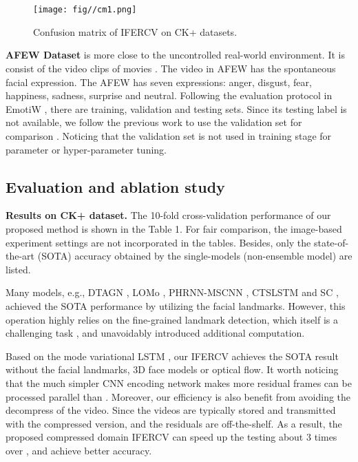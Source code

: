 \documentclass[a4paper,conference]{IEEEtran}
\begin{document}
\begin{figure}[t]
\centering
~\\~\\\texttt{[image: fig//cm1.png]}\\
\caption{Confusion matrix of IFERCV on CK+ datasets.}\label{fig:4} 
\end{figure}

\noindent\textbf{AFEW Dataset} is more close to the uncontrolled real-world environment. It is consist of the video clips of movies \cite{perveen2018spontaneous}. The video in AFEW has the spontaneous facial expression. The AFEW has seven expressions: anger, disgust, fear, happiness, sadness, surprise and neutral. Following the evaluation protocol in EmotiW \cite{dhall2017individual}, there are training, validation and testing sets. Since its testing label is not available, we follow the previous work to use the validation set for comparison \cite{baddar2019mode}. Noticing that the validation set is not used in training stage for parameter or hyper-parameter tuning. 





 


 




\subsection{Evaluation and ablation study}







\noindent\textbf{Results on CK+ dataset.} The 10-fold cross-validation performance of our proposed method is shown in the Table 1. For fair comparison, the image-based experiment settings are not incorporated in the tables. Besides, only the state-of-the-art (SOTA) accuracy obtained by the single-models (non-ensemble model) are listed. 


Many models, e.g., DTAGN \cite{jung2015joint}, LOMo \cite{sikka2016lomo}, PHRNN-MSCNN \cite{zhang2017facial}, CTSLSTM \cite{hu2019video} and SC \cite{verma2019facial}, achieved the SOTA performance by utilizing the facial landmarks. However, this operation highly relies on the fine-grained landmark detection, which itself is a challenging task \cite{li2020deep,liu2019hard}, and unavoidably introduced additional computation.  

Based on the mode variational LSTM \cite{baddar2019mode}, our IFERCV achieves the SOTA result without the facial landmarks, 3D face models or optical flow. It worth noticing that the much simpler CNN encoding network makes more residual frames can be processed parallel than \cite{baddar2019mode}. Moreover, our efficiency is also benefit from avoiding the decompress of the video. Since the videos are typically stored and transmitted with the compressed version, and the residuals are off-the-shelf. As a result, the proposed compressed domain IFERCV can speed up the testing about 3 times over \cite{baddar2019mode}, and achieve better accuracy. 
\end{document}
